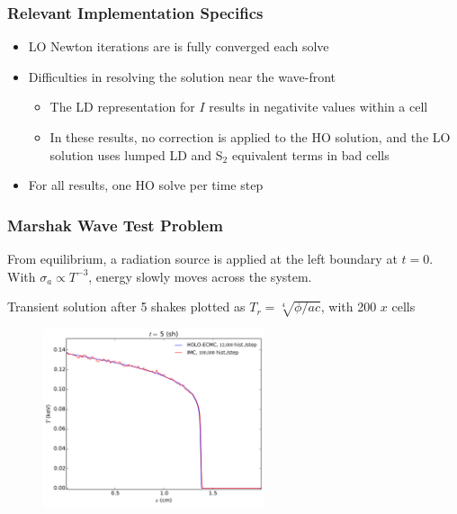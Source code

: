 \documentclass[xcolor=dvipsnames,hyperref={pdfpagelabels=false},unknownkeysallowed]{beamer}
\newlength{\wideitemsep}
\let\olditem\item
\renewcommand{\item}{\setlength{\itemsep}{\wideitemsep}\olditem}
\begin{document}
\begin{frame}
    \frametitle{Relevant Implementation Specifics}
    \begin{itemize}
    \item LO Newton iterations are is fully converged each solve
    \item Difficulties in resolving the solution near the wave-front
        \begin{itemize}
            \item The LD representation for $I$ results in negativite values within a
                cell
            \item In these results, no correction is applied to the HO solution, and the LO
                solution uses lumped LD and S$_2$ equivalent terms in bad cells
        \end{itemize}
    \item For all results, one HO solve per time step
    \end{itemize}
\end{frame}

\begin{frame}
    \frametitle{Marshak Wave Test Problem}
    \centering
    \begin{block}{}
        \begin{itemize}
                {\small
            \item From equilibrium, a radiation source is applied at the left
                boundary at $t=0$. With $\sigma_a\propto T^{-3}$, energy slowly moves across the
                system.\pause
            \item Transient solution after 5 shakes plotted as $T_r = \sqrt[4]{\phi/ac}$, with 200 $x$ cells }
        \end{itemize}
    \end{block}
    \begin{figure}
    \includegraphics[width=0.5799\textwidth]{marshak_200_compare.pdf}
    \end{figure}
\end{frame}
\end{document}
